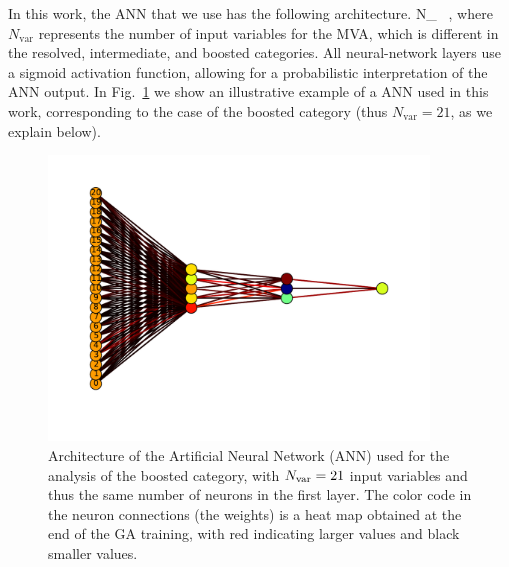 In this work, the ANN that we use has the following architecture.
\be
\label{eq:nn1}
N_{} \, ,
\ee
where $N_{\mathrm{var}}$ represents the number of input variables for the MVA,
which is different in the resolved, intermediate, and boosted categories.
%
All neural-network layers use a sigmoid activation function, allowing
for a probabilistic
interpretation of the ANN output.
%
In Fig.~\ref{fig:nnarch} we show an illustrative
example of a ANN used in this work, corresponding 
to the case of the boosted category (thus $N_{\mathrm{var}}=21$, as we explain below).

\begin{figure}[t]
  \begin{center}
      \vspace{-1cm}
  \includegraphics[width=0.90\textwidth]{plots/bst_nnarch_noPU.pdf}
  \vspace{-2cm}
  \caption{\small Architecture of the Artificial
    Neural Network (ANN)
    used for the analysis of the
    boosted
    category, with $N_{\rm var}=21$ input variables and thus
    the same number of neurons
  in the first layer.
  The color code in the neuron connections (the weights) is a heat map obtained
  at the end of the GA training,
  with red indicating larger values and black smaller values.
}
\label{fig:nnarch}
\end{center}
\end{figure}

